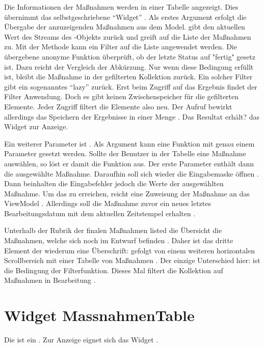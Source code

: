 Die Informationen der Maßnahmen werden in einer Tabelle angezeigt.
Dies übernimmt das selbstgeschriebene \enquote{Widget}  .
Als erstes Argument erfolgt die Übergabe der anzuzeigenden Maßnahmen aus dem Model.  gibt den aktuellen Wert des Streams des -Objekts zurück und greift auf die Liste der Maßnahmen zu. Mit der Methode   kann ein Filter auf die Liste angewendet werden. Die übergebene anonyme Funktion    überprüft, ob der letzte Status auf "fertig" gesetz ist. Dazu reicht der Vergleich der Abkürzung. Nur wenn diese Bedingung erfüllt ist, bleibt die Maßnahme in der gefilterten Kollektion zurück. Ein solcher Filter gibt ein sogenanntes \enquote{lazy}  zurück. Erst beim Zugriff auf das Ergebnis findet der Filter Anwendung. Doch es gibt keinen Zwischenspeicher für die gefilterten Elemente. Jeder Zugriff filtert die Elemente also neu. Der Aufruf  bewirkt allerdings das Speichern der Ergebnisse in einer Menge . Das Resultat erhält? das Widget  zur Anzeige.

Ein weiterer Parameter ist  .
Als Argument kann eine Funktion mit genau einem Parameter gesetzt werden.
Sollte der Benutzer in der Tabelle eine Maßnahme auswählen, so löst er damit die Funktion aus.
Der erste Parameter enthält dann die ausgewählte Maßnahme.
Daraufhin soll sich wieder die Eingabemaske öffnen .
Dann beinhalten die Eingabefehler jedoch die Werte der ausgewählten Maßnahme.  Um das zu erreichen, reicht eine Zuweisung der Maßnahme an das ViewModel . Allerdings soll die Maßnahme zuvor ein neues letztes Bearbeitungsdatum mit dem aktuellen Zeitstempel erhalten .

Unterhalb der Rubrik der finalen Maßnahmen listed die Übersicht die Maßnahmen, welche sich noch im Entwurf befinden .
Daher ist das dritte Element der  wiederum eine Überschrift:   gefolgt von einem weiteren horizontalen Scrollbereich  mit einer Tabelle von Maßnahmen .
Der einzige Unterschied hier: ist die Bedingung der Filterfunktion.
Dieses Mal filtert die Kollektion auf Maßnahmen in Bearbeitung .


\section{Widget MassnahmenTable}

Die  ist ein   .
Zur Anzeige eignet sich das Widget  . 



